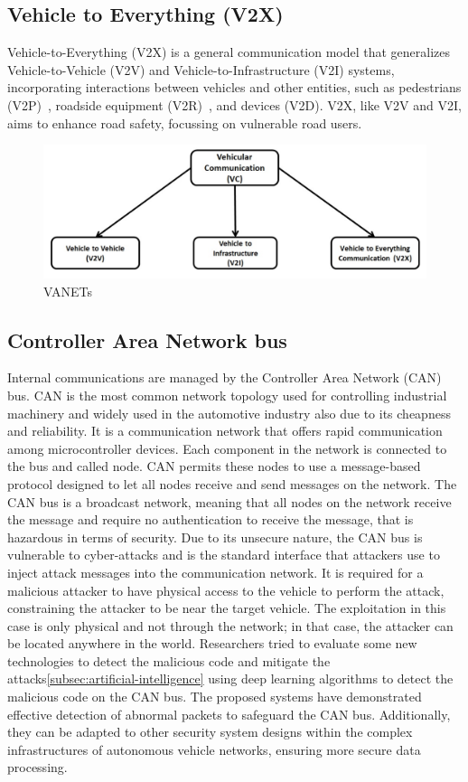 \subsection{Vehicle to Everything (V2X)}\label{subsec:vehicle-to-everything-(v2x)}

Vehicle-to-Everything (V2X) is a general communication model that generalizes Vehicle-to-Vehicle (V2V) and Vehicle-to-Infrastructure (V2I) systems,
incorporating interactions between vehicles and other entities, such as pedestrians (V2P)~\cite{vehicle-to-pedestrian}, roadside equipment (V2R)~\cite{vehicle-to-roadside}, and devices (V2D).
V2X, like V2V and V2I, aims to enhance road safety, focussing on vulnerable road users.

\begin{figure}[!htb]
    \centering
    \includegraphics[width=0.7\linewidth]{figures/communication}
    \caption{VANETs}
    \label{fig:communication}
\end{figure}

\subsection{Controller Area Network bus}\label{subsec:canbus-communication}
Internal communications are managed by the Controller Area Network (CAN) bus.
CAN is the most common network topology
used for controlling industrial machinery
and widely used in the automotive industry also due to its cheapness and reliability.
It is a communication network that offers rapid communication among microcontroller
devices.
Each component in the network is connected to the bus and called node.
CAN permits these nodes to use a message-based protocol designed to
let all nodes receive and send messages on the network\cite{canbus}.
The CAN bus is a broadcast network,
meaning that all nodes on the network receive the message and require no authentication to receive the message,
that is hazardous in terms of security.
Due to its unsecure nature,
the CAN bus is vulnerable to cyber-attacks and is the standard interface that attackers use to inject attack messages into the
communication network.
It is required for a malicious attacker to have physical access to the vehicle to perform the attack, constraining the attacker to be near the target vehicle.
The exploitation in this case is only physical and not through the network;
in that case, the attacker can be located anywhere in the world.
Researchers tried
to evaluate some new technologies to detect the malicious code
and mitigate the attacks\cite{aldhyani2022attacks}\ref{subsec:artificial-intelligence}
using deep learning algorithms to detect the malicious code on the CAN bus.
The proposed systems have demonstrated effective detection of abnormal packets to safeguard the CAN bus.
Additionally,
they can be adapted to other security system designs within the complex infrastructures of autonomous vehicle networks,
ensuring more secure data processing.

